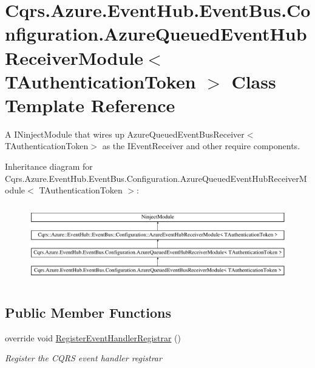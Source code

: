 \hypertarget{classCqrs_1_1Azure_1_1EventHub_1_1EventBus_1_1Configuration_1_1AzureQueuedEventHubReceiverModule}{}\section{Cqrs.\+Azure.\+Event\+Hub.\+Event\+Bus.\+Configuration.\+Azure\+Queued\+Event\+Hub\+Receiver\+Module$<$ T\+Authentication\+Token $>$ Class Template Reference}
\label{classCqrs_1_1Azure_1_1EventHub_1_1EventBus_1_1Configuration_1_1AzureQueuedEventHubReceiverModule}


A I\+Ninject\+Module that wires up Azure\+Queued\+Event\+Bus\+Receiver$<$\+T\+Authentication\+Token$>$ as the I\+Event\+Receiver and other require components.  


Inheritance diagram for Cqrs.\+Azure.\+Event\+Hub.\+Event\+Bus.\+Configuration.\+Azure\+Queued\+Event\+Hub\+Receiver\+Module$<$ T\+Authentication\+Token $>$\+:\begin{figure}[H]
\begin{center}
\leavevmode
\includegraphics[height=3.414634cm]{classCqrs_1_1Azure_1_1EventHub_1_1EventBus_1_1Configuration_1_1AzureQueuedEventHubReceiverModule}
\end{center}
\end{figure}
\subsection*{Public Member Functions}
\begin{DoxyCompactItemize}
\item 
override void \hyperlink{classCqrs_1_1Azure_1_1EventHub_1_1EventBus_1_1Configuration_1_1AzureQueuedEventHubReceiverModule_ab0050be0bdfe6b95d068120a6c276986_ab0050be0bdfe6b95d068120a6c276986}{Register\+Event\+Handler\+Registrar} ()
\begin{DoxyCompactList}\small\item\em Register the C\+Q\+RS event handler registrar \end{DoxyCompactList}\end{DoxyCompactItemize}


